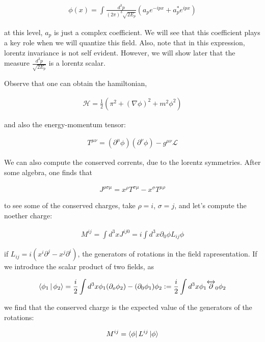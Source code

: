 \documentclass{report}
\begin{document}
\begin{align}
    \phi(x) = \int \frac{d^3p}{(2\pi)^3\sqrt{2E_p}}(a_p e^{-ipx} + a_p^*e^{ipx})
\end{align}

at this level, \(a_p\) is just a complex coefficient. We will see that this coefficient plays a key role when we will quantize this field. Also, note that in this expression, lorentz invariance is not self evident. However, we will show later that the measure \(\frac{d^3p}{\sqrt{2E_p}}\) is a lorentz scalar.  

Observe that one can obtain the hamiltonian, 

\begin{align}
    \mathcal{H} = \frac{1}{2}(\pi^2 + (\nabla\phi)^2 + m^2\phi^2)
\end{align}

and also the energy-momentum tensor: 

\begin{align}
    T^{\mu\nu} = (\partial^\mu\phi)( \partial^\nu\phi) - g^{\mu\nu}\mathcal{L}
\end{align}

We can also compute the conserved corrents, due to the lorentz symmetries. After some algebra, one finds that 

\begin{align}
    J^{\rho\sigma\mu} = x^{\rho}T^{\sigma\mu} - x^{\sigma}T^{\mu\rho}
\end{align}

to see some of the conserved charges, take \(\rho = i\), \(\sigma = j\), and let's compute the noether charge: 

\begin{align}
    M^{ij} = \int d^3x J^{ij0} = i \int d^3x \partial_0 \phi L_{ij} \phi
\end{align}

if \(L_{ij} = i(x^i\partial^j - x^j\partial^i)\), the generators of rotations in the field rapresentation. If we introduce the scalar product of two fields, as 

\begin{align}
    \Braket{\phi_1|\phi_2} = \frac{i}{2}\int d^3x \phi_1(\partial_o\phi_2) - (\partial_0\phi_1)\phi_2 := \frac{i}{2}\int d^3x \phi_1 \overleftrightarrow{\partial}_0 \phi_2
\end{align}

we find that the conserved charge is the expected value of the generators of the rotations: 

\begin{align}
    M^{ij} = \bra{\phi}L^{ij}\ket{\phi}
\end{align}
\end{document}

